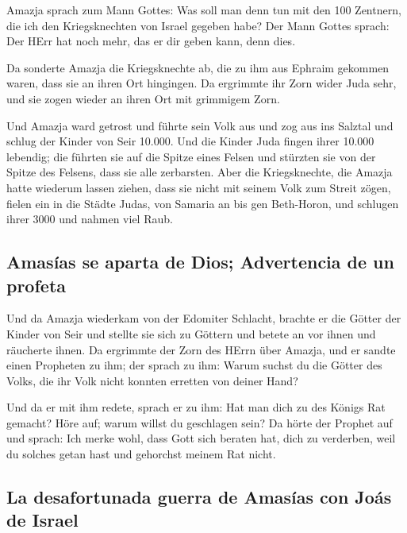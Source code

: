  Amazja sprach zum Mann Gottes: Was soll man denn tun mit
den 100 Zentnern, die ich den Kriegsknechten von Israel gegeben habe?
Der Mann Gottes sprach: Der HErr hat noch mehr, das er dir geben kann,
denn dies.

 Da sonderte Amazja die Kriegsknechte ab, die zu ihm aus
Ephraim gekommen waren, dass sie an ihren Ort hingingen. Da ergrimmte
ihr Zorn wider Juda sehr, und sie zogen wieder an ihren Ort mit
grimmigem Zorn.

 Und Amazja ward getrost und führte sein Volk aus und zog
aus ins Salztal und schlug der Kinder von Seir 10.000. 
Und die Kinder Juda fingen ihrer 10.000 lebendig; die führten sie auf
die Spitze eines Felsen und stürzten sie von der Spitze des Felsens,
dass sie alle zerbarsten.  Aber die Kriegsknechte, die
Amazja hatte wiederum lassen ziehen, dass sie nicht mit seinem Volk zum
Streit zögen, fielen ein in die Städte Judas, von Samaria an bis gen
Beth-Horon, und schlugen ihrer 3000 und nahmen viel Raub.

\hypertarget{amasuxedas-se-aparta-de-dios-advertencia-de-un-profeta}{%
\subsection{Amasías se aparta de Dios; Advertencia de un
profeta}\label{amasuxedas-se-aparta-de-dios-advertencia-de-un-profeta}}

 Und da Amazja wiederkam von der Edomiter Schlacht,
brachte er die Götter der Kinder von Seir und stellte sie sich zu
Göttern und betete an vor ihnen und räucherte ihnen.  Da
ergrimmte der Zorn des HErrn über Amazja, und er sandte einen Propheten
zu ihm; der sprach zu ihm: Warum suchst du die Götter des Volks, die ihr
Volk nicht konnten erretten von deiner Hand?

 Und da er mit ihm redete, sprach er zu ihm: Hat man dich
zu des Königs Rat gemacht? Höre auf; warum willst du geschlagen sein? Da
hörte der Prophet auf und sprach: Ich merke wohl, dass Gott sich beraten
hat, dich zu verderben, weil du solches getan hast und gehorchst meinem
Rat nicht.

\hypertarget{la-desafortunada-guerra-de-amasuxedas-con-jouxe1s-de-israel}{%
\subsection{La desafortunada guerra de Amasías con Joás de
Israel}\label{la-desafortunada-guerra-de-amasuxedas-con-jouxe1s-de-israel}}

